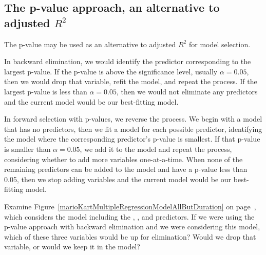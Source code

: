 \subsection{The p-value approach, an alternative to adjusted $R^2$}

The p-value may be used as an alternative to adjusted $R^2$ for model selection.

In backward elimination, we would identify the predictor corresponding to the largest p-value. If the p-value is above the significance level, usually $\alpha = 0.05$, then we would drop that variable, refit the model, and repeat the process. If the largest p-value is less than $\alpha = 0.05$, then we would not eliminate any predictors and the current model would be our best-fitting model.

In forward selection with p-values, we reverse the process. We begin with a model that has no predictors, then we fit a model for each possible predictor, identifying the model where the corresponding predictor's p-value is smallest. If that p-value is smaller than $\alpha = 0.05$, we add it to the model and repeat the process, considering whether to add more variables one-at-a-time. When none of the remaining predictors can be added to the model and have a p-value less than 0.05, then we stop adding variables and the current model would be our best-fitting model.

\begin{exercisewrap}
\begin{nexercise}
Examine Figure~\ref{marioKartMultipleRegressionModelAllButDuration} on page~\pageref{marioKartMultipleRegressionModelAllButDuration}, which considers the model including the , , and  predictors. If we were using the p-value approach with backward elimination and we were considering this model, which of these three variables would be up for elimination? Would we drop that variable, or would we keep it in the model?\footnotemark
\end{nexercise}
\end{exercisewrap}

